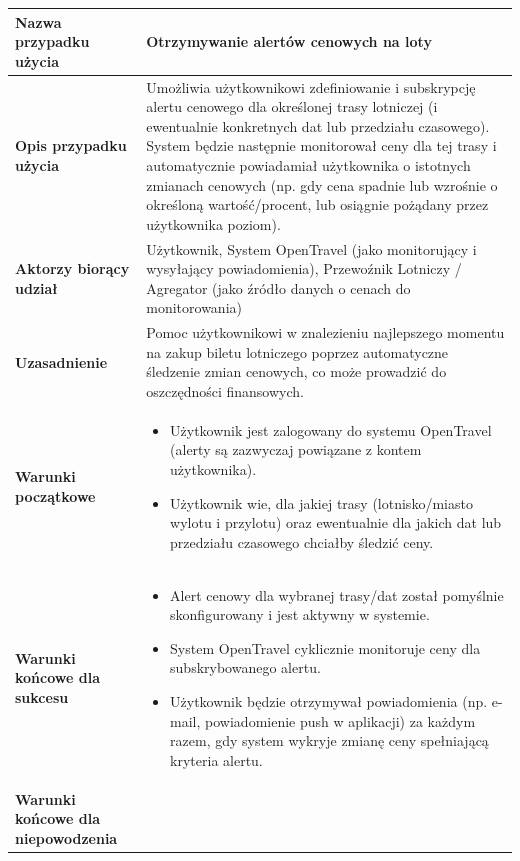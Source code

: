 \documentclass[a4paper,12pt]{article}
\begin{document}
\begin{longtable}{|p{\pierwszakolumnaszerokoscPUBLAlertCen}|p{\drugakolumnaszerokoscPUBLAlertCen}|}
    \textbf{Nazwa przypadku użycia} & Otrzymywanie alertów cenowych na loty \\
    \hline
    \textbf{Opis przypadku użycia} & Umożliwia użytkownikowi zdefiniowanie i subskrypcję alertu cenowego dla określonej trasy lotniczej (i ewentualnie konkretnych dat lub przedziału czasowego). System będzie następnie monitorował ceny dla tej trasy i automatycznie powiadamiał użytkownika o istotnych zmianach cenowych (np. gdy cena spadnie lub wzrośnie o określoną wartość/procent, lub osiągnie pożądany przez użytkownika poziom). \\
    \hline
    \textbf{Aktorzy biorący udział} & Użytkownik, System OpenTravel (jako monitorujący i wysyłający powiadomienia), Przewoźnik Lotniczy / Agregator (jako źródło danych o cenach do monitorowania) \\
    \hline
    \textbf{Uzasadnienie} & Pomoc użytkownikowi w znalezieniu najlepszego momentu na zakup biletu lotniczego poprzez automatyczne śledzenie zmian cenowych, co może prowadzić do oszczędności finansowych. \\
    \hline
    \textbf{Warunki początkowe} &
        \begin{itemize} \itemsep0pt \parskip0pt \parsep0pt
            \item Użytkownik jest zalogowany do systemu OpenTravel (alerty są zazwyczaj powiązane z kontem użytkownika).
            \item Użytkownik wie, dla jakiej trasy (lotnisko/miasto wylotu i przylotu) oraz ewentualnie dla jakich dat lub przedziału czasowego chciałby śledzić ceny.
        \end{itemize} \\
    \hline
    \textbf{Warunki końcowe dla sukcesu} &
        \begin{itemize} \itemsep0pt \parskip0pt \parsep0pt
            \item Alert cenowy dla wybranej trasy/dat został pomyślnie skonfigurowany i jest aktywny w systemie.
            \item System OpenTravel cyklicznie monitoruje ceny dla subskrybowanego alertu.
            \item Użytkownik będzie otrzymywał powiadomienia (np. e-mail, powiadomienie push w aplikacji) za każdym razem, gdy system wykryje zmianę ceny spełniającą kryteria alertu.
        \end{itemize} \\
    \hline
    \textbf{Warunki końcowe dla niepowodzenia} &
        \begin{itemize} \itemsep0pt \parskip0pt \parsep0pt

\end{itemize}
\end{longtable}
\end{document}
